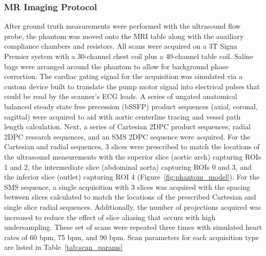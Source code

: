 \subsubsection{MR Imaging Protocol}
After ground truth measurements were performed with the ultrasound flow probe, the phantom was moved onto the MRI table along with the auxiliary compliance chambers and resistors. All scans were acquired on a 3T Signa Premier system with a 30-channel chest coil plus a 40-channel table coil. Saline bags were arranged around the phantom to allow for background phase correction. The cardiac gating signal for the acquisition was simulated via a custom device built to translate the pump motor signal into electrical pulses that could be read by the scanner's ECG leads. A series of ungated anatomical balanced steady state free precession (bSSFP) product sequences (axial, coronal, sagittal) were acquired to aid with aortic centerline tracing and vessel path length calculation. Next, a series of Cartesian 2DPC product sequences, radial 2DPC research sequences, and an SMS 2DPC sequence were acquired. For the Cartesian and radial sequences, 3 slices were prescribed to match the locations of the ultrasound measurements with the superior slice (aortic arch) capturing ROIs 1 and 2, the intermediate slice (abdominal aorta) capturing ROIs 0 and 3, and the inferior slice (outlet) capturing ROI 4 (Figure~\ref{fig:phantom_model}). For the SMS sequence, a single acquisition with 3 slices was acquired with the spacing between slices calculated to match the locations of the prescribed Cartesian and single slice radial sequences. Additionally, the number of projections acquired was increased to reduce the effect of slice aliasing that occurs with high undersampling. These set of scans were repeated three times with simulated heart rates of 60 bpm, 75 bpm, and 90 bpm. Scan parameters for each acquisition type are listed in Table~\ref{tab:scan_params}

